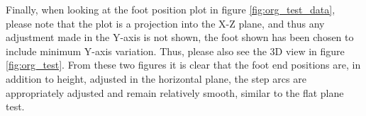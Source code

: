     Finally, when looking at the foot position plot in figure \ref{fig:org_test_data}, please note that the plot is a projection into the X-Z plane, and thus any
    adjustment made in the Y-axis is not shown, the foot shown has been chosen to include minimum Y-axis variation. 
    Thus, please also see the 3D view in figure \ref{fig:org_test}. From these two figures it is clear that the foot end positions are, in addition to height,
    adjusted in the horizontal plane, the step arcs are appropriately adjusted and remain relatively smooth, similar to the flat plane test.


